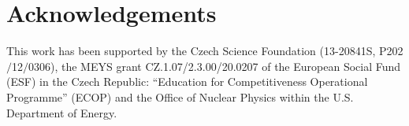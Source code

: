 \documentclass[english]{ddny}
\begin{document}
\section*{Acknowledgements}
This work has been supported by the Czech Science Foundation
(13-20841S, P202$/$12$/$0306),  the MEYS grant CZ.1.07/2.3.00/20.0207 of the European Social Fund (ESF) in the Czech Republic: “Education for Competitiveness Operational Programme” (ECOP) and the Office of Nuclear Physics within the U.S. Department of Energy.  




{}


		
\end{document}
